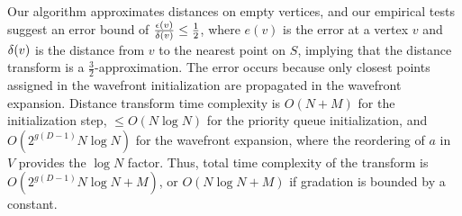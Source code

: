 \documentclass{egpubl}
\renewcommand{\paragraph}[1]{\noindent \textbf{#1}}
\begin{document}
Our algorithm approximates distances on empty vertices, and our empirical tests suggest an error bound of $\frac{\epsilon(v)}{\delta(v)} \le \frac{1}{2}$, where $e(v)$ is the error at a vertex $v$ and $\delta(v)$ is the distance from $v$ to the nearest point on $S$, implying that the distance transform is a $\frac{3}{2}$-approximation.  The error occurs because only closest points assigned in the wavefront initialization are propagated in the wavefront expansion.  Distance transform time complexity is $O(N+M)$ for the initialization step, $\le O(N\log{N})$ for the priority queue initialization, and $O(2^{g(D-1)}N\log{N})$ for the wavefront expansion, where the reordering of $a$ in $V$ provides the $\log{N}$ factor.  Thus, total time complexity of the transform is $O(2^{g(D-1)}N\log{N} + M)$, or $O(N\log{N} + M)$ if gradation is bounded by a constant.


%
\end{document}
